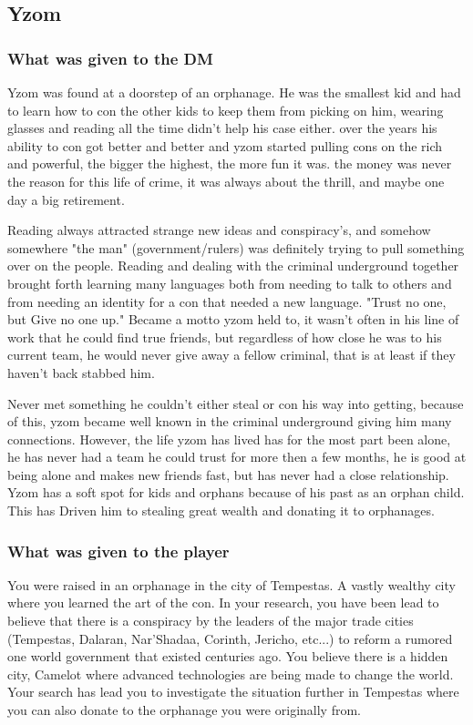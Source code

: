 \subsection{Yzom}

\subsubsection{What was given to the DM}

Yzom was found at a doorstep of an orphanage. He was the smallest kid and had to learn how to con the other kids to keep them from picking on him, wearing glasses and reading all the time didn't help his case either. over the years his ability to con got better and better and yzom started pulling cons on the rich and powerful, the bigger the highest, the more fun it was. the money was never the reason for this life of crime, it was always about the thrill, and maybe one day a big retirement.

Reading always attracted strange new ideas and conspiracy's, and somehow somewhere "the man" (government/rulers) was definitely trying to pull something over on the people. Reading and dealing with the criminal underground together brought forth learning many languages both from needing to talk to others and from needing an identity for a con that needed a new language. "Trust no one, but Give no one up." Became a motto yzom held to, it wasn't often in his line of work that he could find true friends, but regardless of how close he was to his current team, he would never give away a fellow criminal, that is at least if they haven't back stabbed him.

Never met something he couldn't either steal or con his way into getting, because of this, yzom became well known in the criminal underground giving him many connections. However, the life yzom has lived has for the most part been alone, he has never had a team he could trust for more then a few months, he is good at being alone and makes new friends fast, but has never had a close relationship. Yzom has a soft spot for kids and orphans because of his past as an orphan child. This has Driven him to stealing great wealth and donating it to orphanages.

\subsubsection{What was given to the player}

You were raised in an orphanage in the city of Tempestas. A vastly wealthy city where you learned the art of the con. In your research, you have been lead to believe that there is a conspiracy by the leaders of the major trade cities (Tempestas, Dalaran, Nar'Shadaa, Corinth, Jericho, etc...) to reform a rumored one world government that existed centuries ago. You believe there is a hidden city, Camelot where advanced technologies are being made to change the world. Your search has lead you to investigate the situation further in Tempestas where you can also donate to the orphanage you were originally from. 

